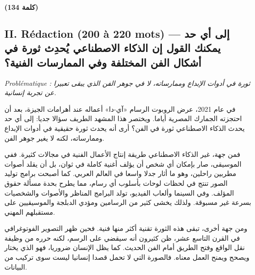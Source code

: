 \documentclass[11pt,a4paper]{article}
\begin{document}
\textbf{(134 كلمة)}

\hypertarget{ii.-ruxe9daction-200-uxe0-220-mots-ux625ux644ux649-ux623ux64a-ux62dux62f-ux64aux645ux643ux646ux643-ux627ux644ux642ux648ux644-ux625ux646-ux627ux644ux630ux643ux627ux621-ux627ux644ux627ux635ux637ux646ux627ux639ux64a-ux64aux62dux62fux62b-ux62bux648ux631ux629-ux641ux64a-ux623ux634ux643ux627ux644-ux627ux644ux641ux646-ux627ux644ux645ux62eux62aux644ux641ux629-ux648ux641ux64a-ux627ux644ux645ux645ux627ux631ux633ux627ux62a-ux627ux644ux641ux646ux64aux629}{%
\subsection{II. Rédaction (200 à 220 mots) --- إلى أي حد يمكنك القول إن الذكاء الاصطناعي يُحدِث ثورة في أشكال الفن المختلفة وفي الممارسات الفنية؟}\label{ii.-ruxe9daction-200-uxe0-220-mots-ux625ux644ux649-ux623ux64a-ux62dux62f-ux64aux645ux643ux646ux643-ux627ux644ux642ux648ux644-ux625ux646-ux627ux644ux630ux643ux627ux621-ux627ux644ux627ux635ux637ux646ux627ux639ux64a-ux64aux62dux62fux62b-ux62bux648ux631ux629-ux641ux64a-ux623ux634ux643ux627ux644-ux627ux644ux641ux646-ux627ux644ux645ux62eux62aux644ux641ux629-ux648ux641ux64a-ux627ux644ux645ux645ux627ux631ux633ux627ux62a-ux627ux644ux641ux646ux64aux629}}

\emph{Problématique : ثورة في أدوات الإبداع وممارساته، لا في جوهر الفن الذي يبقى تعبيرا عن تجربة إنسانية.}

في عام 2021، عرض الروبوت الرسام «آي-دا» أعماله عند أهرامات الجيزة، بعد أن احتجزته الجمارك المصرية أياما. ويختصر هذا المشهد الطريف سؤالا جديا: إلى أي حد يحدث الذكاء الاصطناعي ثورة في الفن؟ أرى أنه يحدث ثورة حقيقية في أدوات الإبداع وممارساته، لكنه لا يغير جوهر الفن.

فمن جهة، غير الذكاء الاصطناعي طريقة إنتاج الأعمال الفنية في مجالات كثيرة. ففي الموسيقى، صار بإمكان أي شخص أن يؤلف أغنية كاملة في ثوان، بل أن يقلد أصوات مطربين راحلين، وهو ما أثار جدلا واسعا في العالم العربي. كما أصبحت برامج توليد الصور تنتج في لحظات لوحات بأسلوب أي رسام، مما يطرح بحدة مسألة حقوق المؤلف. وفي السينما وألعاب الفيديو، تولد البرامج المناظر والأصوات والشخصيات بسرعة غير مسبوقة. ولذلك يخشى كثير من الرسامين ومؤدي الدبلجة والموسيقيين على مستقبلهم المهني.

ومن جهة أخرى، تبقى هذه الثورة تقنية أكثر منها فنية. فحين ظهر التصوير الفوتوغرافي في القرن التاسع عشر، ظن كثيرون أنه سيقضي على الرسم، لكنه حرره من وظيفة نقل الواقع وفتح الطريق أمام الفن الحديث. كما يظل الإنسان ضروريا، فهو الذي يختار ويصحح ويمنح العمل معناه. فالصورة التي لا تحمل قصدا إنسانيا ليست سوى تركيب من البيانات.
\end{document}
